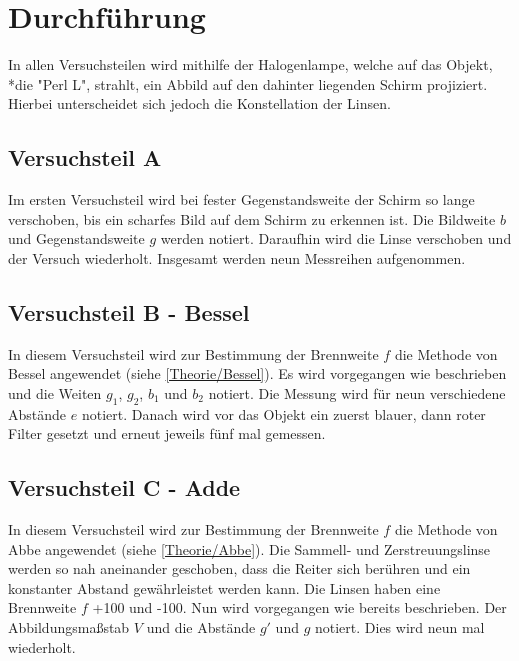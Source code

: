 \newpage
\section{Durchführung}
\label{Durchführung}
In allen Versuchsteilen wird mithilfe der Halogenlampe, welche auf das Objekt, \\*die "Perl L", strahlt, ein Abbild auf den dahinter liegenden Schirm projiziert. Hierbei unterscheidet sich jedoch die Konstellation der Linsen.

\subsection{Versuchsteil A}
\label{TeilA}
Im ersten Versuchsteil wird bei fester Gegenstandsweite der Schirm so lange verschoben, bis ein scharfes Bild auf dem Schirm zu erkennen ist. Die Bildweite $b$ und Gegenstandsweite $g$ werden notiert. Daraufhin wird die Linse verschoben und der Versuch wiederholt. Insgesamt werden neun Messreihen aufgenommen.

\subsection{Versuchsteil B - Bessel}
\label{TeilB}
In diesem Versuchsteil wird zur Bestimmung der Brennweite $f$ die Methode von Bessel angewendet (siehe \ref{Theorie/Bessel}). Es wird vorgegangen wie beschrieben und die Weiten $g_1$, $g_2$, $b_1$ und $b_2$ notiert. Die Messung wird für neun verschiedene Abstände $e$ notiert.
Danach wird vor das Objekt ein zuerst blauer, dann roter Filter gesetzt und erneut jeweils fünf mal gemessen. 

\subsection{Versuchsteil C - Adde}
\label{TeilC}
In diesem Versuchsteil wird zur Bestimmung der Brennweite $f$ die Methode von Abbe angewendet (siehe \ref{Theorie/Abbe}). Die Sammell- und Zerstreuungslinse werden so nah aneinander geschoben, dass die Reiter sich berühren und ein konstanter Abstand gewährleistet werden kann. Die Linsen haben eine Brennweite $f$ +100 und -100. Nun wird vorgegangen wie bereits beschrieben. Der Abbildungsmaßstab $V$ und die Abstände $g'$ und $g$ notiert. Dies wird neun mal wiederholt.
